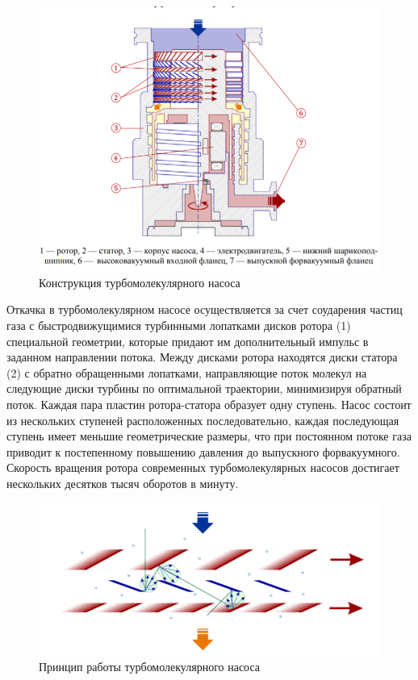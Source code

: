 \documentclass[a4paper,12pt]{article}
\begin{document}
\begin{figure}[h]
    \centering
    \includegraphics[width = 12 cm]{ТМН}
    \caption{Конструкция турбомолекулярного насоса}
    \label{fig:vac}
\end{figure}

Откачка в турбомолекулярном насосе осуществляется за
счет соударения частиц газа с быстродвижущимися турбинными лопатками дисков ротора (1) специальной геометрии, которые придают им дополнительный импульс в заданном направлении потока. Между дисками ротора находятся диски статора (2) с обратно обращенными лопатками, направляющие поток молекул на следующие диски турбины по оптимальной траектории, минимизируя обратный поток. Каждая пара пластин ротора-статора образует одну ступень. Насос состоит из нескольких ступеней расположенных последовательно, каждая последующая ступень имеет меньшие геометрические размеры, что при постоянном потоке
газа приводит к постепенному повышению давления до выпускного форвакуумного. Скорость вращения ротора современных турбомолекулярных
насосов достигает нескольких десятков тысяч оборотов в минуту.

\begin{figure}[h]
    \centering
    \includegraphics[width = 10.5 cm]{Принцип ТМН}
    \caption{Принцип работы турбомолекулярного насоса}
    \label{fig:vac}
\end{figure}
\end{document}
